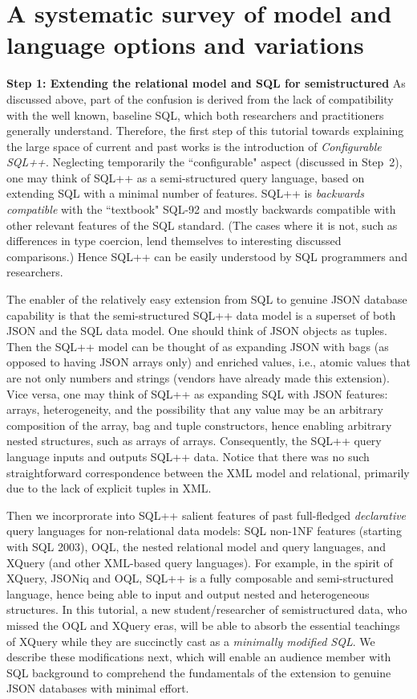 \section{A systematic survey of model and language options and variations} 
\noindent \textbf{Step 1: Extending the relational model and SQL for semistructured} As discussed above, part of the confusion is derived from the lack of compatibility with the well known, baseline SQL, which both researchers and practitioners generally understand. Therefore, the first step of this tutorial towards explaining the large space of current and past works is the introduction of \emph{Configurable SQL++}. Neglecting temporarily the ``configurable" aspect (discussed in Step~2), one may think of SQL++ as a semi-structured query language, based on extending SQL with a minimal number of features. SQL++ is {\em backwards compatible} with the ``textbook" SQL-92 and mostly backwards compatible with other relevant features of the SQL standard. (The cases where it is not, such as differences in type coercion, lend themselves to interesting discussed comparisons.) Hence SQL++ can be easily understood by SQL programmers and researchers.

The enabler of the relatively easy extension from SQL to genuine JSON database capability is that the semi-structured SQL++ data model is a superset of both JSON and the SQL data model. One should think of JSON objects as tuples. Then the SQL++ model can be thought of as expanding JSON with bags (as opposed to having JSON arrays only) and enriched values, i.e., atomic values that are not only numbers and strings (vendors have already made this extension).
Vice versa, one may think of SQL++ as expanding SQL with JSON features: arrays, heterogeneity, and the possibility that any value may be an arbitrary composition of the array, bag and tuple constructors, hence enabling arbitrary nested structures, such as arrays of arrays. Consequently, the SQL++ query language inputs and outputs SQL++ data. Notice that there was no such straightforward correspondence between the XML model and relational, primarily due to the lack of explicit tuples in XML.

Then we incorprorate into SQL++ salient features of past full-fledged \textit{declarative} query languages for non-relational data models: SQL non-1NF features (starting with SQL 2003), OQL,
the nested relational model and query languages,
and XQuery (and other XML-based query languages).
For example, in the spirit of XQuery, JSONiq and OQL, SQL++ is a fully composable and semi-structured language, hence being able to input and output nested and heterogeneous structures. In this tutorial, a new student/researcher of semistructured data, who missed the OQL and XQuery eras, will be able to absorb the essential teachings of XQuery while they are succinctly cast as a {\em minimally modified SQL}. We describe these modifications next, which will enable an audience member with SQL background to comprehend the fundamentals of the extension to genuine JSON databases with minimal effort.

